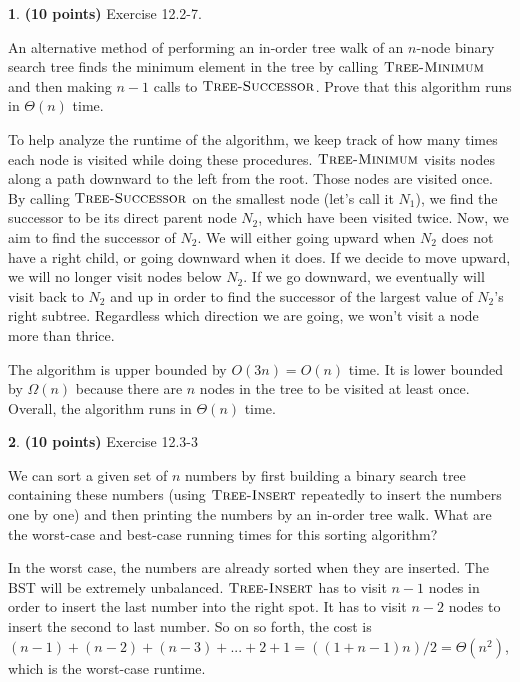\documentclass[11pt]{article}
\theoremstyle{definition}
\theoremstyle{theorem}
\newtheorem{prob}{}
\newcommand{\solution}{\medskip\noindent{\color{DarkBlue}\textbf{Solution:}}}
\begin{document}
\newpage
\begin{prob} \textbf{(10 points)} Exercise 12.2-7.
\end{prob}
An alternative method of performing an in-order tree walk of an $n$-node binary search tree finds the minimum element in the tree by calling $\textproc{\textsc{Tree-Minimum}}$ and then making $n - 1$ calls to $\textproc{\textsc{Tree-Successor}}$. Prove that this algorithm runs in $\Theta{(n)}$ time.

\solution

To help analyze the runtime of the algorithm, we keep track of how many times each node is visited while doing these procedures. $\textproc{\textsc{Tree-Minimum}}$ visits nodes along a path downward to the left from the root. Those nodes are visited once. By calling $\textproc{\textsc{Tree-Successor}}$ on the smallest node (let's call it $N_1$), we find the successor to be its direct parent node $N_2$, which have been visited twice. Now, we aim to find the successor of $N_2$. We will either going upward when $N_2$ does not have a right child, or going downward when it does. If we decide to move upward, we will no longer visit nodes below $N_2$. If we go downward, we eventually will visit back to $N_2$ and up in order to find the successor of the largest value of $N_2$'s right subtree. Regardless which direction we are going, we won't visit a node more than thrice.

The algorithm is upper bounded by $O(3n) = O(n)$ time. It is lower bounded by $\Omega{(n)}$ because there are $n$ nodes in the tree to be visited at least once. Overall, the algorithm runs in $\Theta{(n)}$ time.


\newpage
\begin{prob} \textbf{(10 points)} Exercise 12.3-3
\end{prob}
We can sort a given set of $n$ numbers by first building a binary search tree containing these numbers (using $\textproc{\textsc{Tree-Insert}}$ repeatedly to insert the numbers one by one) and then printing the numbers by an in-order tree walk. What are the worst-case and best-case running times for this sorting algorithm?

\solution

In the worst case, the numbers are already sorted when they are inserted. The BST will be extremely unbalanced. $\textproc{\textsc{Tree-Insert}}$ has to visit $n-1$ nodes in order to insert the last number into the right spot. It has to visit $n-2$ nodes to insert the second to last number. So on so forth, the cost is $(n-1) + (n-2) + (n-3) + ... + 2 + 1 = ((1 + n - 1)n)/2 = \Theta{(n^2)}$, which is the worst-case runtime.
\end{document}
